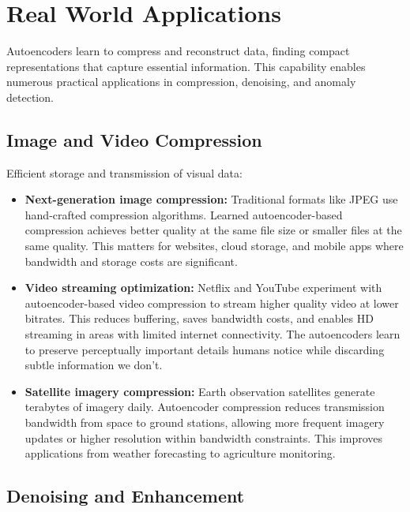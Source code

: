 
\section{Real World Applications}
\label{sec:autoencoder-real-world}

Autoencoders learn to compress and reconstruct data, finding compact representations that capture essential information. This capability enables numerous practical applications in compression, denoising, and anomaly detection.

\subsection{Image and Video Compression}

Efficient storage and transmission of visual data:

\begin{itemize}
    \item \textbf{Next-generation image compression:} Traditional formats like JPEG use hand-crafted compression algorithms. Learned autoencoder-based compression achieves better quality at the same file size or smaller files at the same quality. This matters for websites, cloud storage, and mobile apps where bandwidth and storage costs are significant.
    
    \item \textbf{Video streaming optimization:} Netflix and YouTube experiment with autoencoder-based video compression to stream higher quality video at lower bitrates. This reduces buffering, saves bandwidth costs, and enables HD streaming in areas with limited internet connectivity. The autoencoders learn to preserve perceptually important details humans notice while discarding subtle information we don't.
    
    \item \textbf{Satellite imagery compression:} Earth observation satellites generate terabytes of imagery daily. Autoencoder compression reduces transmission bandwidth from space to ground stations, allowing more frequent imagery updates or higher resolution within bandwidth constraints. This improves applications from weather forecasting to agriculture monitoring.
\end{itemize}

\subsection{Denoising and Enhancement}

